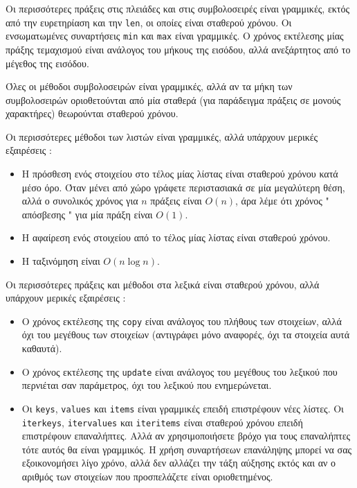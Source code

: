 \documentclass[10pt]{book}
\begin{document}
Οι περισσότερες πράξεις στις πλειάδες και στις συμβολοσειρές είναι γραμμικές, εκτός 
από την ευρετηρίαση και την  {\tt len},  οι οποίες είναι σταθερού χρόνου.  Οι 
ενσωματωμένες συναρτήσεις  {\tt min}  και  {\tt max}  είναι γραμμικές.  
Ο χρόνος εκτέλεσης μίας πράξης τεμαχισμού είναι ανάλογος του μήκους της εισόδου, αλλά ανεξάρτητος από το μέγεθος της εισόδου.

Όλες οι μέθοδοι συμβολοσειρών είναι γραμμικές, αλλά αν τα μήκη των συμβολοσειρών οριοθετούνται από μία σταθερά (για παράδειγμα πράξεις σε μονούς χαρακτήρες) θεωρούνται σταθερού χρόνου.

Οι περισσότερες μέθοδοι των λιστών είναι γραμμικές, αλλά υπάρχουν μερικές εξαιρέσεις : 

\begin{itemize}

\item Η πρόσθεση ενός στοιχείου στο τέλος μίας λίστας είναι σταθερού χρόνου κατά μέσο όρο. Όταν μένει από χώρο γράφετε περιστασιακά σε μία μεγαλύτερη θέση, αλλά ο συνολικός χρόνος για $n$ πράξεις είναι $O(n)$, άρα λέμε ότι χρόνος  " απόσβεσης "  για μία πράξη είναι $O(1)$.

\item Η αφαίρεση ενός στοιχείου από το τέλος μίας λίστας είναι σταθερού χρόνου.

\item Η ταξινόμηση είναι $O(n \log n)$.

\end{itemize}

 Οι περισσότερες πράξεις και μέθοδοι στα λεξικά είναι σταθερού χρόνου, αλλά υπάρχουν μερικές εξαιρέσεις :

 
\begin{itemize}

\item Ο χρόνος εκτέλεσης της  {\tt copy}  είναι ανάλογος του πλήθους των 
  στοιχείων, αλλά όχι του μεγέθους των στοιχείων (αντιγράφει μόνο αναφορές, όχι 
  τα στοιχεία αυτά καθαυτά).

\item Ο χρόνος εκτέλεσης της  {\tt update}  είναι ανάλογος του μεγέθους του 
  λεξικού που περνιέται σαν παράμετρος, όχι του λεξικού που ενημερώνεται.

\item Οι  {\tt keys}, {\tt values}  και  {\tt items}  είναι γραμμικές 
  επειδή επιστρέφουν νέες λίστες.  Οι  {\tt iterkeys}, {\tt itervalues}  και 
   {\tt iteritems}  είναι σταθερού χρόνου επειδή επιστρέφουν επαναλήπτες.  
  Αλλά αν χρησιμοποιήσετε βρόχο για τους επαναλήπτες τότε αυτός θα είναι γραμμικός. 
  Η χρήση συναρτήσεων επανάληψης μπορεί να σας εξοικονομήσει λίγο χρόνο, αλλά δεν 
  αλλάζει την τάξη αύξησης εκτός και αν ο αριθμός των στοιχείων που προσπελάζετε 
  είναι οριοθετημένος.

\end{itemize}
\end{document}
